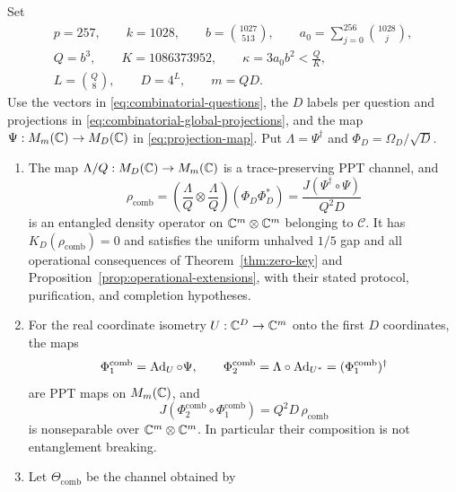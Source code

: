 \begin{theorem}\label{thm:old-construction}
Set
\begin{equation}\label{eq:combinatorial-exact-data}
 \begin{gathered}
 p=257,\qquad k=1028,\qquad
 b=\binom{1027}{513},\qquad
 a_0=\sum_{j=0}^{256}\binom{1028}{j},\\
 Q=b^3,\qquad K=1086373952,\qquad
 \kappa=3a_0b^2<\frac QK,\\
 L=\binom Q8,\qquad D=4^L,\qquad m=QD.
 \end{gathered}
\end{equation}
Use the vectors in \eqref{eq:combinatorial-questions}, the \(D\)
labels per question and projections in
\eqref{eq:combinatorial-global-projections}, and the map
\(\Psi:M_{m}(\mathbb C)\to M_{D}(\mathbb C)\) in \eqref{eq:projection-map}.
Put \(\Lambda=\Psi^\dagger\) and
\(\Phi_D=\Omega_D/\sqrt D\).
\begin{enumerate}
 \item The map \(\Lambda/Q:M_{D}(\mathbb C)\to M_{m}(\mathbb C)\) is a trace-preserving
       PPT channel, and
       \begin{equation}\label{eq:combinatorial-state}
        \rho_{\mathrm{comb}}
        =\left(\frac{\Lambda}{Q}\otimes\frac{\Lambda}{Q}\right)
          (\Phi_D\Phi_D^*)
        =\frac{J(\Psi^\dagger\circ\Psi)}{Q^2D}
       \end{equation}
       is an entangled density operator on
       \(\mathbb C^m\otimes\mathbb C^m\) belonging to \(\mathscr C\).
       It has \(K_D(\rho_{\mathrm{comb}})=0\) and satisfies the uniform
       unhalved \(1/5\) gap and all operational consequences of
       Theorem~\ref{thm:zero-key} and
       Proposition~\ref{prop:operational-extensions}, with their stated
       protocol, purification, and completion hypotheses.
 \item For the real coordinate isometry \(U:\mathbb C^D\to\mathbb C^m\) onto the
       first \(D\) coordinates, the maps
       \[
        \Phi_1^{\mathrm{comb}}=\operatorname{Ad}_U\circ\Psi,\qquad
        \Phi_2^{\mathrm{comb}}=\Lambda\circ\operatorname{Ad}_{U^*}
                 =(\Phi_1^{\mathrm{comb}})^\dagger
       \]
       are PPT maps on \(M_{m}(\mathbb C)\), and
       \begin{equation}\label{eq:combinatorial-pair}
        J(\Phi_2^{\mathrm{comb}}\circ\Phi_1^{\mathrm{comb}})
          =Q^2D\,\rho_{\mathrm{comb}}
       \end{equation}
       is nonseparable over \(\mathbb C^m\otimes\mathbb C^m\).  In particular their composition is not
       entanglement breaking.
 \item Let \(\Theta_{\mathrm{comb}}\) be the channel obtained by

\end{enumerate}
\end{theorem}
